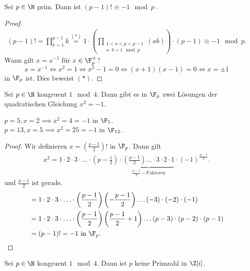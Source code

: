\begin{lemma}
	Sei $p \in \N$ prim. Dann ist $(p-1)! \equiv -1 \mod p$ .
\end{lemma}

\begin{proof}
	\begin{align*}
		(p-1)! = \prod_{k=1}^{p-1} k \stackrel{(*)}{=} 1 \cdot \left(\prod_{\substack{1 < a < p < p-1\\ a\cdot b = 1 \mod p}} (ab) \right) \cdot (p-1) \equiv -1 \mod p
	.\end{align*}
	Wann gilt $x = x^{-1}$ für $x \in \F_{p}^{\times}$? 
	\[
		x = x^{-1} \Leftrightarrow x^2 = 1 \Leftrightarrow x^2 -1 = 0 \Leftrightarrow (x+1)(x-1) = 0 \Leftrightarrow x = \pm 1
	\] 
	in $\F_{p}$ ist. Dies beweist $(*)$.
\end{proof}

\begin{proposition}
	Sei $p \in \N$ kongruent $1 \mod 4$.
	Dann gibt es in  $\F_{p}$ zwei Lösungen der quadratischen Gleichung $x^2 = -1$.
\end{proposition}

\begin{eg}
	$p = 5, x = 2 \implies x^2 = 4 = -1 $ in $\F_{5}$.\\
	$p = 13, x = 5 \implies x^2 = 25 = -1$ in $\F_{13}$.
\end{eg}

\begin{proof}
	Wir definieren $x = \left( \frac{p-1}{2} \right)!$ in $\F_{p}$.
	Dann gilt
	\begin{align*}
		x^2 = 1 \cdot 2 \cdot 3 \cdot \ldots \cdot \left(p-\frac{1}{2}\right) \cdot\underbrace{ \left( \frac{p-1}{2} \right) \ldots \cdot 3 \cdot 2 \cdot 1
		}_{\frac{p-1}{2} - \text{Faktoren}} \cdot (-1)^{\frac{p-1}{2}}
	.\end{align*}
	und $\frac{p-1}{2}$ ist gerade.
	\begin{align*}
		&= 1 \cdot 2 \cdot 3 \cdot \ldots \cdot  \left( \frac{p-1}{2} \right) \left( - \frac{p-1}{2} \right) \ldots (-3) \cdot (-2) \cdot (-1)\\
		&= 1 \cdot 2 \cdot 3 \cdot \ldots \cdot  \left( \frac{p-1}{2} \right) \left( \frac{p-1}{2} +1 \right) \ldots (p-3) \cdot (p-2) \cdot (p-1)\\
		&= (p-1)! = -1 \text{ in } \F_{p}
	.\end{align*}
\end{proof}

\begin{corollar}
	Sei $p \in \N$ kongruent $1 \mod 4$. Dann ist $p$ keine Primzahl in $\Z[i]$.
\end{corollar}

